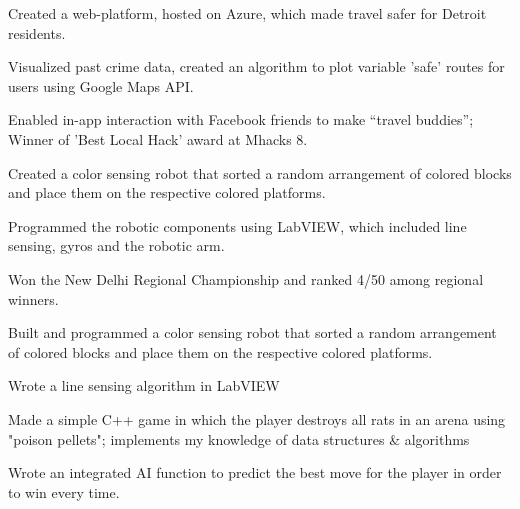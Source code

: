 \documentclass[letterpaper]{deedy-resume-openfont} %
\begin{document}
\begin{minipage}[t]{0.66\textwidth}
\begin{tightemize}
\item Created a web-platform, hosted on Azure, which made travel safer for Detroit residents.
\item Visualized past crime data, created an algorithm to plot variable 'safe' routes for users using Google Maps API.
\item Enabled in-app interaction with Facebook friends to make “travel buddies”; Winner of 'Best Local Hack' award at Mhacks 8.
\end{tightemize}

\sectionsep %

\begin{tightemize}
\item Created a color sensing robot that sorted a random arrangement of colored blocks and place them on the respective colored platforms.
\item Programmed the robotic components using LabVIEW, which included line sensing, gyros and the robotic arm.
\item Won the New Delhi Regional Championship and ranked 4/50 among regional winners.
\end{tightemize}

\sectionsep %

\begin{tightemize}
\item Built and programmed a color sensing robot that sorted a random arrangement of colored blocks and place them on the respective colored platforms.
\item Wrote a line sensing algorithm in LabVIEW 
\end{tightemize}
\sectionsep %

\begin{tightemize}
\item Made a simple C++ game in which the player destroys all rats in an arena using "poison pellets"; implements my knowledge of data structures \& algorithms
\item Wrote an integrated AI function to predict the best move for the player in order to win every time.
\end{tightemize}


\end{minipage} %
\end{document}
